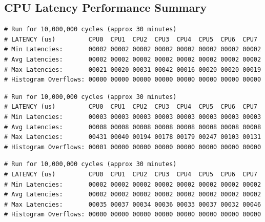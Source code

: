 \clearpage
\pagebreak

\subsection{CPU Latency Performance Summary}

\begin{lstlisting}[caption={Debian10 HP-Laptop-01 CPU Performance}, label=tab-Debian10 HP-Laptop-01 CPU Performance]	
# Run for 10,000,000 cycles (approx 30 minutes)
# LATENCY (us)         CPU0  CPU1  CPU2  CPU3  CPU4  CPU5  CPU6  CPU7
# Min Latencies:       00002 00002 00002 00002 00002 00002 00002 00002
# Avg Latencies:       00002 00002 00002 00002 00002 00002 00002 00002
# Max Latencies:       00021 00020 00031 00042 00016 00020 00020 00019
# Histogram Overflows: 00000 00000 00000 00000 00000 00000 00000 00000
\end{lstlisting}

\begin{lstlisting}[caption={Ubuntu20 HP-Laptop-01 CPU Performance}, label=tab-Ubuntu20 HP-Laptop-01 CPU Performance]	
# Run for 10,000,000 cycles (approx 30 minutes)
# LATENCY (us)         CPU0  CPU1  CPU2  CPU3  CPU4  CPU5  CPU6  CPU7
# Min Latencies:       00003 00003 00003 00003 00003 00003 00003 00003
# Avg Latencies:       00008 00008 00008 00008 00008 00008 00008 00008
# Max Latencies:       00431 00040 00194 00178 00179 00247 00103 00131
# Histogram Overflows: 00001 00000 00000 00000 00000 00000 00000 00000
\end{lstlisting}

\begin{lstlisting}[caption={Debian10 HP-Laptop-02 CPU Performance}, label=tab-Debian10 HP-Laptop-02 CPU Performance]	
# Run for 10,000,000 cycles (approx 30 minutes)
# LATENCY (us)         CPU0  CPU1  CPU2  CPU3  CPU4  CPU5  CPU6  CPU7
# Min Latencies:       00002 00002 00002 00002 00002 00002 00002 00002
# Avg Latencies:       00002 00002 00002 00002 00002 00002 00002 00002
# Max Latencies:       00035 00037 00034 00036 00033 00037 00032 00046
# Histogram Overflows: 00000 00000 00000 00000 00000 00000 00000 00000
\end{lstlisting}

